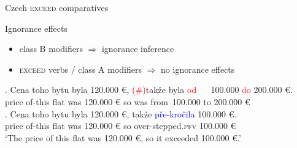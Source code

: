 \documentclass[12pt]{beamer}
\begin{document}
\begin{frame}{Czech \textsc{exceed} comparatives}

Ignorance effects

\begin{itemize}
\item class B modifiers $\Rightarrow$ ignorance inference%
\item \textsc{exceed} verbs / class A modifiers $\Rightarrow$ no ignorance effects
\end{itemize}
\exg. Cena toho bytu byla 120.000 {\euro,} \textcolor{red}{(\#)}takže byla \textcolor{red}{od }~{ }~100.000 \textcolor{red}{do} {200.000 {\euro}}.\label{ex:classB}\\
price of-this flat was 120.000 {\euro} so was from~100.000 to {200.000 {\euro}}\\

\exg. Cena toho bytu byla 120.000 {\euro,} takže \textcolor{blue}{pře-kročila} {100.000 {\euro}}.\label{ex:classA}\\
price of-this flat was 120.000 {\euro} so over-stepped.\textsc{pfv} {100.000 {\euro}}\\
`The price of this flat was 120.000 {\euro}, so it exceeded 100.000 {\euro}.'


\end{frame}
\end{document}
